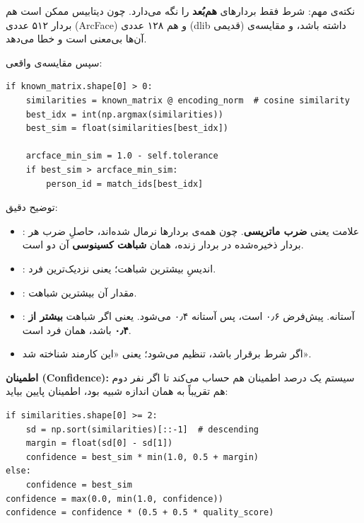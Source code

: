 \documentclass[12pt,a4paper]{article}
\begin{document}
\begin{note}
نکته‌ی مهم: شرط  فقط بردارهای \textbf{هم‌بُعد} را نگه می‌دارد. چون دیتابیس ممکن است هم بردار ۵۱۲ عددی (ArcFace) و هم ۱۲۸ عددی (dlib قدیمی) داشته باشد، و مقایسه‌ی آن‌ها بی‌معنی است و خطا می‌دهد.
\end{note}

سپس مقایسه‌ی واقعی:

\begin{latin}
\begin{lstlisting}
if known_matrix.shape[0] > 0:
    similarities = known_matrix @ encoding_norm  # cosine similarity
    best_idx = int(np.argmax(similarities))
    best_sim = float(similarities[best_idx])

    arcface_min_sim = 1.0 - self.tolerance
    if best_sim > arcface_min_sim:
        person_id = match_ids[best_idx]
\end{lstlisting}
\end{latin}

توضیح دقیق:
\begin{itemize}[rightmargin=0pt]
  \item {}: علامت  یعنی \textbf{ضرب ماتریسی}. چون همه‌ی بردارها نرمال شده‌اند، حاصلِ ضرب هر بردار ذخیره‌شده در بردار زنده، همان \textbf{شباهت کسینوسی} آن دو است.
  \item {}: اندیسِ بیشترین شباهت؛ یعنی نزدیک‌ترین فرد.
  \item {}: مقدار آن بیشترین شباهت.
  \item {}: آستانه.  پیش‌فرض ۰٫۶ است، پس آستانه ۰٫۴ می‌شود. یعنی اگر شباهت \textbf{بیشتر از ۰٫۴} باشد، همان فرد است.
  \item اگر شرط برقرار باشد،  تنظیم می‌شود؛ یعنی «این کارمند شناخته شد».
\end{itemize}

\textbf{اطمینان (Confidence):} سیستم یک درصد اطمینان هم حساب می‌کند تا اگر نفر دوم هم تقریباً به همان اندازه شبیه بود، اطمینان پایین بیاید:

\begin{latin}
\begin{lstlisting}
if similarities.shape[0] >= 2:
    sd = np.sort(similarities)[::-1]  # descending
    margin = float(sd[0] - sd[1])
    confidence = best_sim * min(1.0, 0.5 + margin)
else:
    confidence = best_sim
confidence = max(0.0, min(1.0, confidence))
confidence = confidence * (0.5 + 0.5 * quality_score)
\end{lstlisting}
\end{latin}
\end{document}
